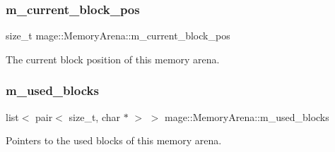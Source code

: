 \subsubsection{\texorpdfstring{m\+\_\+current\+\_\+block\+\_\+pos}{m\_current\_block\_pos}}
{\footnotesize\ttfamily size\+\_\+t mage\+::\+Memory\+Arena\+::m\+\_\+current\+\_\+block\+\_\+pos\hspace{0.3cm}{\ttfamily [protected]}}

The current block position of this memory arena. \hypertarget{classmage_1_1_memory_arena_a9fc33bafde45afe06d05732572f415d1}{}\label{classmage_1_1_memory_arena_a9fc33bafde45afe06d05732572f415d1} 
\subsubsection{\texorpdfstring{m\+\_\+used\+\_\+blocks}{m\_used\_blocks}}
{\footnotesize\ttfamily list$<$ pair$<$ size\+\_\+t, char $\ast$ $>$ $>$ mage\+::\+Memory\+Arena\+::m\+\_\+used\+\_\+blocks\hspace{0.3cm}{\ttfamily [protected]}}

Pointers to the used blocks of this memory arena. 